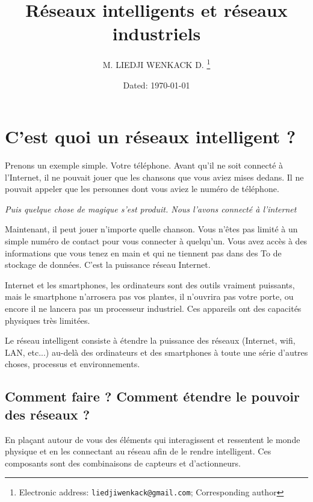 \documentclass[12pt]{report}
\title{Réseaux intelligents et réseaux industriels}
\author{M. LIEDJI WENKACK D.%
  \thanks{Electronic address: \texttt{liedjiwenkack@gmail.com}; Corresponding author}}
\affil{University of Dschang, Cameroon\\ Master professionnel\\ Niveau: 2\\ Option : RTS}
\date{Dated: \today}
\begin{document}
\maketitle
\tableofcontents
\hypertarget{que-sont-les-ruxe9seaux-intelligents}{%
      \chapter{\texorpdfstring{C'est quoi un réseaux intelligent ?
        }{C'est quoi réseaux intelligent ?}}\label{que-sont-les-ruxe9seaux-intelligents}}

Prenons un exemple simple. Votre téléphone. Avant qu'il ne soit connecté
à l'Internet, il ne pouvait jouer que les chansons que vous aviez mises dedans. Il ne pouvait
appeler que les personnes dont vous aviez le numéro de téléphone.

\emph{Puis quelque chose de magique s'est produit. Nous l'avons connecté
      à l'internet}

Maintenant, il peut jouer n'importe quelle chanson. Vous n'êtes pas
limité à un simple numéro de contact pour vous connecter à quelqu'un.
Vous avez accès à des informations que vous tenez en main et qui ne
tiennent pas dans des To de stockage de données. C'est la puissance réseau Internet.

Internet et les smartphones, les ordinateurs sont des outils vraiment
puissants, mais le smartphone n'arrosera pas vos plantes, il n'ouvrira
pas votre porte, ou encore il ne lancera pas un processeur industriel. Ces appareils ont des capacités physiques très limitées.

Le réseau intelligent consiste à étendre la puissance des réseaux (Internet, wifi, LAN, etc...)
au-delà des ordinateurs et des smartphones à toute une série d'autres
choses, processus et environnements.

\hypertarget{comment-faire-comment-uxe9tendre-le-pouvoir-uxe0-linternet}{%
      \section{\texorpdfstring{Comment faire ? Comment étendre le pouvoir des réseaux ?
        }{Comment faire ? Comment étendre le pouvoir des réseaux ? }}\label{comment-faire-comment-uxe9tendre-le-pouvoir-uxe0-linternet}}

En plaçant autour de vous des éléments qui interagissent et ressentent
le monde physique et en les connectant au réseau afin de le rendre intelligent. Ces composants sont
des combinaisons de capteurs et d'actionneurs.
\end{document}
